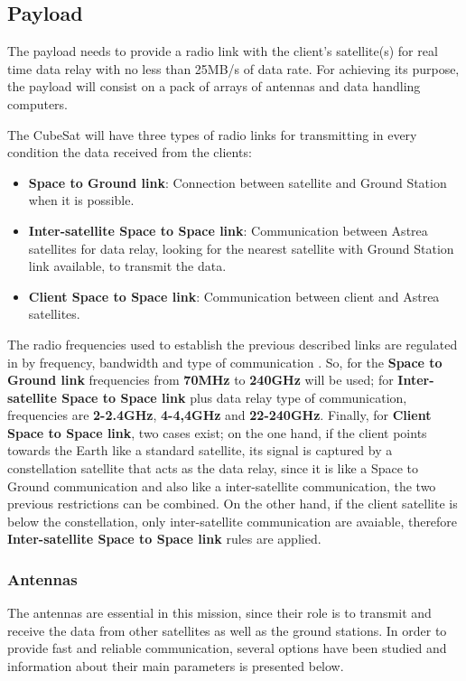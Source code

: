 \subsection{Payload}
The payload needs to provide a radio link with the client's satellite(s) for real time data relay with no less than 25MB/s of data rate. For achieving its purpose, the payload will consist on a pack of arrays of antennas and data handling computers. 

The CubeSat will have three types of radio links for transmitting in every condition the data received from the clients:
\begin{itemize}
\item \textbf{Space to Ground link}: Connection between satellite and Ground Station when it is possible.
\item \textbf{Inter-satellite Space to Space link}: Communication between Astrea satellites for data relay, looking for the nearest satellite with Ground Station link available, to transmit the data.
\item \textbf{Client Space to Space link}: Communication between client and Astrea satellites.
\end{itemize}

The radio frequencies used to establish the previous described links are regulated in \cite{SecretariadeEstadodetelecomunicacionesyparalasociedaddelainformacion.2015} by frequency, bandwidth and type of communication . So, for the \textbf{Space to Ground link} frequencies from \textbf{70MHz} to \textbf{240GHz} will be used; for \textbf{Inter-satellite Space to Space link} plus data relay type of communication, frequencies are \textbf{2-2.4GHz}, \textbf{4-4,4GHz} and \textbf{22-240GHz}. Finally, for \textbf{Client Space to Space link}, two cases exist; on the one hand, if the client points towards the Earth like a standard satellite, its signal is captured by a constellation satellite that acts as the data relay, since it is like a Space to Ground communication and also like a inter-satellite communication, the two previous restrictions can be combined. On the other hand, if the client satellite is below the constellation, only inter-satellite communication are avaiable, therefore \textbf{Inter-satellite Space to Space link} rules are applied.

\subsubsection{Antennas}
The antennas are essential in this mission, since their role is to transmit and receive the data from other satellites as well as the ground stations. In order to provide fast and reliable communication, several options have been studied and information about their main parameters is presented below.

